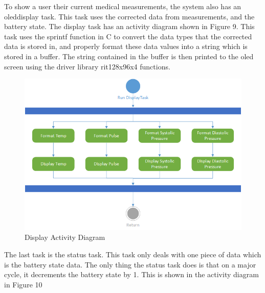 \documentclass[12pt]{article} %
\begin{document}
To show a user their current medical measurements, the system also has an oleddisplay task. This task uses the corrected data from measurements, and the battery state. The display task has an activity diagram shown in Figure 9. This task uses the sprintf function in C to convert the data types that the corrected data is stored in, and properly format these data values into a string which is stored in a buffer. The string contained in the buffer is then printed to the oled screen using the driver library rit128x96x4 functions.

\begin{figure}
    \centering
    \includegraphics[width=\textwidth]{design/display_activity.png}
    \caption{Display Activity Diagram}
    \label{fig:Display}
\end{figure}



The last task is the status task. This task only deals with one piece of data which is the battery state data. The only thing the status task does is that on a major cycle, it decrements the battery state by 1. This is shown in the activity diagram in Figure 10
\end{document}

